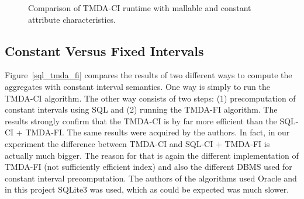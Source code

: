 \documentclass[a4paper,11pt]{article}
\begin{document}
\begin{figure}[ht!]
	\begin{center}
	\end{center}
	\caption{Comparison of TMDA-CI runtime with mallable and constant attribute characteristics.}
	\label{mal_vs_const}
\end{figure} 

\subsection{Constant Versus Fixed Intervals}

Figure~\ref{sql_tmda_fi} compares the results of two different ways to compute the aggregates with constant interval semantics. One way is simply to run the TMDA-CI algorithm. The other way consists of two steps: (1) precomputation of constant intervals using SQL and (2) running the TMDA-FI algorithm. The results strongly confirm that the TMDA-CI is by far more efficient than the SQL-CI + TMDA-FI. The same results were acquired by the authors. In fact, in our experiment the difference between TMDA-CI and SQL-CI + TMDA-FI is actually much bigger. The reason for that is again the different implementation of TMDA-FI (not sufficiently efficient index) and also the different DBMS used for constant interval precomputation. The authors of the algorithms used Oracle and in this project SQLite3 was used, which as could be expected was much slower.
\end{document}
